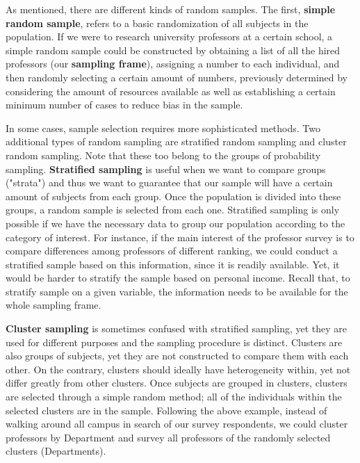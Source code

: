 \documentclass{book}
\begin{document}
As mentioned, there are different kinds of random samples. The first,
\textbf{simple random sample}, refers to a basic randomization of all subjects
in the population. If we were to research university professors at a certain
school, a simple random sample could be constructed by obtaining a list of all
the hired professors (our \textbf{sampling frame}), assigning a number to each
individual, and then randomly selecting a certain amount of numbers,
previously determined by considering the amount of resources available as well
as establishing a certain minimum number of cases to reduce bias in the
sample.

In some cases, sample selection requires more sophisticated methods. Two
additional types of random sampling are stratified random sampling and cluster
random sampling. Note that these too belong to the groups of probability
sampling. \textbf{Stratified sampling} is useful when we want to compare
groups ("strata") and thus we want to guarantee that our sample will have a
certain amount of subjects from each group. Once the population is divided
into these groups, a random sample is selected from each one. Stratified
sampling is only possible if we have the necessary data to group our
population according to the category of interest. For instance, if the main
interest of the professor survey is to compare differences among professors of
different ranking, we could conduct a stratified sample based on this
information, since it is readily available. Yet, it would be harder to
stratify the sample based on personal income. Recall that, to stratify sample
on a given variable, the information needs to be available for the whole
sampling frame.

\textbf{Cluster sampling} is sometimes confused with stratified sampling, yet
they are used for different purposes and the sampling procedure is distinct.
Clusters are also groups of subjects, yet they are not constructed to compare
them with each other. On the contrary, clusters should ideally have
heterogeneity within, yet not differ greatly from other clusters. Once
subjects are grouped in clusters, clusters are selected through a simple
random method; all of the individuals within the selected clusters are in the
sample. Following the above example, instead of walking around all campus in
search of our survey respondents, we could cluster professors by Department
and survey all professors of the randomly selected clusters (Departments).
\end{document}
